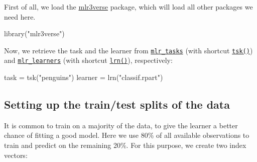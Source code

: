 \documentclass[
]{scrbook}
\newenvironment{Shaded}{\begin{snugshade}}{\end{snugshade}}
\newcommand{\FloatTok}[1]{\textcolor[rgb]{0.00,0.00,0.81}{#1}}
\newcommand{\FunctionTok}[1]{\textcolor[rgb]{0.00,0.00,0.00}{#1}}
\newcommand{\NormalTok}[1]{#1}
\newcommand{\OtherTok}[1]{\textcolor[rgb]{0.56,0.35,0.01}{#1}}
\newcommand{\SpecialCharTok}[1]{\textcolor[rgb]{0.00,0.00,0.00}{#1}}
\newcommand{\StringTok}[1]{\textcolor[rgb]{0.31,0.60,0.02}{#1}}
\renewenvironment{Shaded} {\begin{snugshade}\small} {\end{snugshade}}
\begin{document}
First of all, we load the \href{https://mlr3verse.mlr-org.com}{mlr3verse} package, which will load all other packages we need here.

\begin{Shaded}
\begin{Highlighting}[]
\FunctionTok{library}\NormalTok{(}\StringTok{"mlr3verse"}\NormalTok{)}
\end{Highlighting}
\end{Shaded}

Now, we retrieve the task and the learner from \href{https://mlr3.mlr-org.com/reference/mlr_tasks.html}{\texttt{mlr\_tasks}} (with shortcut \href{https://mlr3.mlr-org.com/reference/mlr_sugar.html}{\texttt{tsk()}}) and \href{https://mlr3.mlr-org.com/reference/mlr_learners.html}{\texttt{mlr\_learners}} (with shortcut \href{https://mlr3.mlr-org.com/reference/mlr_sugar.html}{\texttt{lrn()}}), respectively:

\begin{Shaded}
\begin{Highlighting}[]
\NormalTok{task }\OtherTok{=} \FunctionTok{tsk}\NormalTok{(}\StringTok{"penguins"}\NormalTok{)}
\NormalTok{learner }\OtherTok{=} \FunctionTok{lrn}\NormalTok{(}\StringTok{"classif.rpart"}\NormalTok{)}
\end{Highlighting}
\end{Shaded}

\hypertarget{split-data}{%
\subsection{Setting up the train/test splits of the data}\label{split-data}}

It is common to train on a majority of the data, to give the learner a better chance of fitting a good model.
Here we use 80\% of all available observations to train and predict on the remaining 20\%.
For this purpose, we create two index vectors:

\begin{Shaded}
\end{Shaded}
\end{document}
